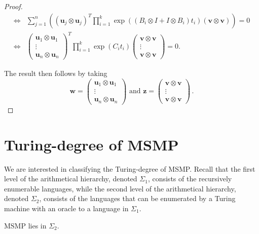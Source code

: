 \documentclass[format=acmsmall, review=false, screen=true]{acmart}
\newcommand{\myvector}{\boldsymbol}
\begin{document}
\begin{proof}
\begin{align*}
\Leftrightarrow &\sum \limits_{j=1}^{n} \left( \left( \myvector{u}_{j} \otimes \myvector{u}_{j} \right)^{T} \prod \limits_{i=1}^{k} \exp\left((B_{i} \otimes I + I \otimes B_{i}) t_{i} \right) \left( \myvector{v} \otimes \myvector{v} \right) \right) = 0 \\
\Leftrightarrow &\begin{pmatrix} \myvector{u}_{1} \otimes \myvector{u}_{1} \\ \vdots \\ \myvector{u}_{n} \otimes \myvector{u}_{n} \end{pmatrix}^{T} \prod \limits_{i=1}^{k} \exp( C_{i} t_{i} ) \begin{pmatrix} \myvector{v} \otimes \myvector{v} \\ \vdots \\ \myvector{v} \otimes \myvector{v} \end{pmatrix} = 0 .
\end{align*}

The result then follows by taking
\begin{equation*}
  \myvector{w} = \begin{pmatrix} \myvector{u}_{1} \otimes \myvector{u}_{1} \\ \vdots \\ \myvector{u}_{n} \otimes \myvector{u}_{n} \end{pmatrix}
  \mbox{ and } \myvector{z} = \begin{pmatrix} \myvector{v} \otimes \myvector{v} \\ \vdots \\ \myvector{v} \otimes \myvector{v} \end{pmatrix} \, .
\end{equation*}
\end{proof}

\section{Turing-degree of MSMP}
\label{sec:turing-degree-lics}

We are interested in classifying the Turing-degree of MSMP\@.  Recall
that the first level of the arithmetical hierarchy, denoted
$\Sigma_1$, consists of the recursively enumerable languages, while
the second level of the arithmetical hierarchy, denoted $\Sigma_2$,
consists of the languages that can be enumerated by a Turing machine
with an oracle to a language in $\Sigma_1$.


\begin{theorem}
\label{thm:turing-degree-2}
$\mbox{MSMP}$ lies in $\Sigma_2$.
\end{theorem}
\end{document}
